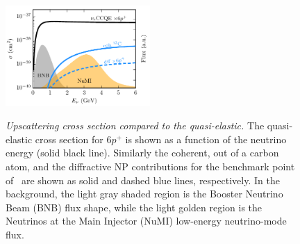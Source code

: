 %
\begin{figure}[t!]
    \centering
    \includegraphics[width=0.49\textwidth]{cross_sections.pdf}
    \caption{{\textit{Upscattering cross section compared to the quasi-elastic.}} The quasi-elastic cross section for $6p^+$ is shown as a function of the neutrino energy (solid black line). Similarly the coherent, out of a carbon atom, and the diffractive NP contributions for the benchmark point of~\cite{Bertuzzo:2018itn} are shown as solid and dashed blue lines, respectively. In the background, the light gray shaded region is the Booster Neutrino Beam (BNB) flux shape, while the light golden region is the Neutrinos at the Main Injector (NuMI) low-energy neutrino-mode flux.}{\label{fig:cross_section}}
\end{figure}

